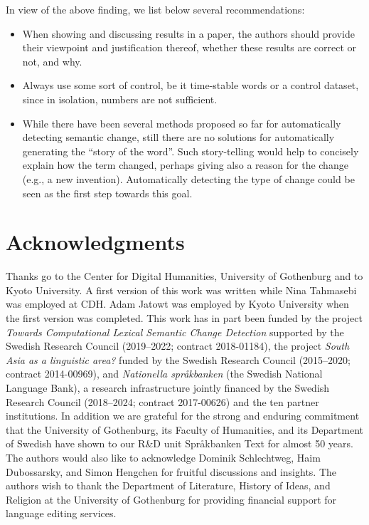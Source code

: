 \documentclass[output=paper]{langsci/langscibook}
\begin{document}
In view of the above finding, we list below several recommendations: 

\begin{itemize}
\item When showing and discussing results in a paper, the authors should provide their viewpoint and justification thereof, whether these results are correct or not, and why. 

\item Always use some sort of control, be it time-stable words or a control dataset, since in isolation, numbers are not sufficient.

\item While there have been several methods proposed so far for automatically detecting semantic change, still there are no solutions for automatically generating the ``story of the word''. Such story-telling would help to concisely explain how the term changed, perhaps giving also a reason for the change (e.g., a new invention). Automatically detecting the type of change could be seen as the first step towards this goal.
\end{itemize}



\section*{Acknowledgments}
Thanks go to the Center for Digital Humanities, University of Gothenburg and to Kyoto University. A first version of this work was written while Nina Tahmasebi was employed at CDH. Adam Jatowt was employed by Kyoto University when the first version was completed. This work has in part been funded by the project \textit{Towards Computational Lexical Semantic Change Detection} supported  by the Swedish Research Council (2019–2022; contract 2018-01184), the project \emph{South Asia as a linguistic area?} funded by the Swedish Research Council (2015--2020; contract 2014-00969), and \emph{Nationella språkbanken} (the Swedish National Language Bank), a research infrastructure jointly financed by the Swedish Research Council (2018--2024; contract 2017-00626) and the ten partner institutions. In
addition we are grateful for the strong and enduring commitment that the
University of Gothenburg, its Faculty of Humanities, and its
Department of Swedish have shown to our R\&D unit Språkbanken Text for
almost 50 years. 
The authors would also like to acknowledge Dominik Schlechtweg, Haim Dubossarsky, and Simon Hengchen for fruitful discussions and insights.  
The authors wish to thank the Department of Literature, History of Ideas, and Religion at the University of Gothenburg for providing financial support for language editing services.
\end{document}
